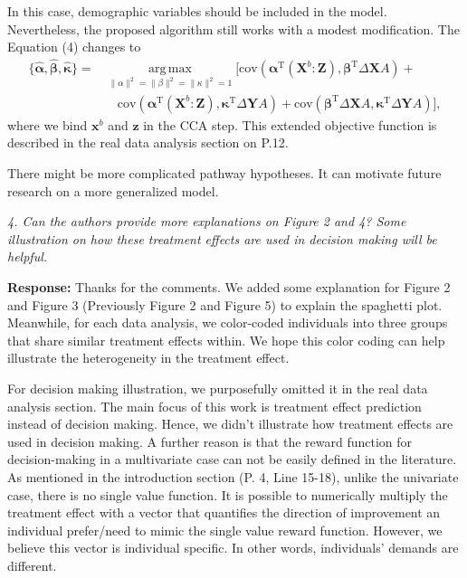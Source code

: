 \documentclass[11pt]{article}
\DeclareMathOperator*{\argmax}{arg\,max}
\newcommand{\trnp}{^\text{T}}
\begin{document}
In this case, demographic variables should be included in the model. Nevertheless, the proposed algorithm still works with a modest modification. The Equation (4) changes to
\begin{align*}
\{\bm{\widehat{\alpha}}, \bm{\widehat{\beta}}, \bm{\widehat{\kappa}}\} = & \argmax\limits_{\lVert\alpha\rVert^2 = \lVert\beta\rVert^2 = \lVert\kappa\rVert^2 = 1}
\Big[ \text{cov}( \bm \alpha\trnp (\bm{X}^b:\bm{Z}), \bm \beta \trnp \Delta \bm{X} A ) + \nonumber \\ 
&\quad \text{cov} (\bm \alpha\trnp (\bm{X}^b:\bm{Z}), \bm \kappa \trnp \Delta \bm{Y} A) +\text{cov}(\bm \beta\trnp \Delta \bm{X} A, \bm \kappa\trnp \Delta \bm{Y} A ) \Big], \label{eqn:multiblock}
\end{align*}
where we bind $\bm{x}^b$ and $\bm{z}$ in the CCA step. This extended objective function is described in the real data analysis section on P.12.


There might be more complicated pathway hypotheses. It can motivate future research on a more generalized model.


\bigskip

{\em 4. Can the authors provide more explanations on Figure 2 and 4? Some illustration on how these treatment effects are used in decision making will be helpful.}

\medskip

\textbf{Response:} Thanks for the comments. We added some explanation for Figure 2 and Figure 3 (Previously Figure 2 and Figure 5) to explain the spaghetti plot. Meanwhile, for each data analysis, we color-coded individuals into three groups that share similar treatment effects within. We hope this color coding can help illustrate the heterogeneity in the treatment effect. 


For decision making illustration, we purposefully omitted it in the real data analysis section. The main focus of this work is treatment effect prediction instead of decision making. Hence, we didn't illustrate how treatment effects are used in decision making. A further reason is that the reward function for decision-making in a multivariate case can not be easily defined in the literature. As mentioned in the introduction section (P. 4, Line 15-18), unlike the univariate case, there is no single value function. It is possible to numerically multiply the treatment effect with a vector that quantifies the direction of improvement an individual prefer/need to mimic the single value reward function. However, we believe this vector is individual specific. In other words, individuals' demands are different. 
\end{document}
